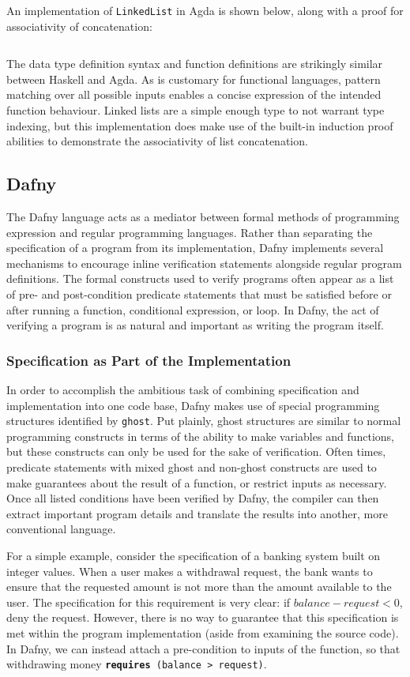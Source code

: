 \documentclass{article}
\begin{document}
An implementation of \texttt{LinkedList} in Agda is shown below, along with a proof for associativity of concatenation:
\inputminted{agda}{linked_list/main.agda}
The data type definition syntax and function definitions are strikingly similar between Haskell and Agda.
As is customary for functional languages, pattern matching over all possible inputs enables a concise expression
of the intended function behaviour. Linked lists are a simple enough type to not warrant type indexing, but this
implementation does make use of the built-in induction proof abilities to demonstrate the associativity of list concatenation.


\subsection{Dafny}

The Dafny language acts as a mediator between formal methods of programming expression and regular programming languages.
Rather than separating the specification of a program from its implementation, Dafny implements several mechanisms
to encourage inline verification statements alongside regular program definitions. The formal constructs used
to verify programs often appear as a list of pre- and post-condition
predicate statements that must be satisfied before or after running a function, conditional expression, or loop.
In Dafny, the act of verifying a program is as natural and important as writing the program itself.

\subsubsection{Specification as Part of the Implementation}

In order to accomplish the ambitious task of combining specification and implementation into one code base,
Dafny makes use of special programming structures identified by \texttt{ghost}. Put plainly, ghost structures are similar
to normal programming constructs in terms of the ability to make variables and functions, but these constructs
can only be used for the sake of verification. Often times, predicate statements with mixed ghost and non-ghost constructs
are used to make guarantees about the result
of a function, or restrict inputs as necessary. Once all listed conditions have been verified by Dafny,
the compiler can then extract important program details
and translate the results into another, more conventional language.

For a simple example, consider the specification of a banking system built on integer values.
When a user makes a withdrawal request, the bank wants to ensure that the requested amount is not more
than the amount available to the user. The specification for this requirement is very clear:
if $balance - request < 0$, deny the request. However, there is no way to guarantee that this specification is met
within the program implementation (aside from examining the source code). In Dafny, we can instead
attach a pre-condition to inputs of the function, so that withdrawing money \texttt{\textbf{requires} (balance > request)}.
\end{document}
